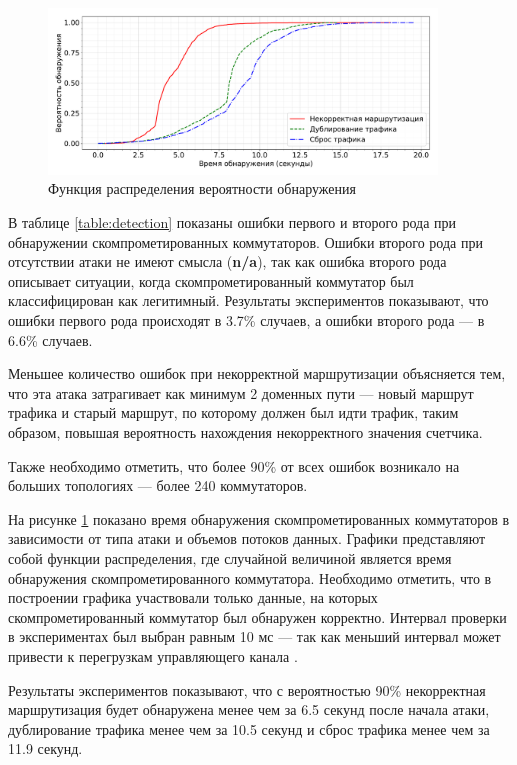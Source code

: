 \documentclass[../thesis.tex]{subfiles}
\begin{document}
\begin{figure}
\centering
\includegraphics[width=0.92\textwidth]{figures/experiments/detection.pdf}
\caption{Функция распределения вероятности обнаружения} \label{fig:detection_cdf}
\end{figure}

В таблице \ref{table:detection} показаны ошибки первого и второго рода при обнаружении скомпрометированных коммутаторов.
Ошибки второго рода при отсутствии атаки не имеют смысла (\textbf{n/a}), так как ошибка второго рода описывает ситуации, когда скомпрометированный коммутатор был классифицирован как легитимный.
Результаты экспериментов показывают, что ошибки первого рода происходят в 3.7\% случаев, а ошибки второго рода --- в 6.6\% случаев.

Меньшее количество ошибок при некорректной маршрутизации объясняется тем, что эта атака затрагивает как минимум 2 доменных пути --- новый маршрут трафика и старый маршрут, по которому должен был идти трафик, таким образом, повышая вероятность нахождения некорректного значения счетчика.

Также необходимо отметить, что более 90\% от всех ошибок возникало на больших топологиях --- более 240 коммутаторов.

На рисунке \ref{fig:detection_cdf} показано время обнаружения скомпрометированных коммутаторов в зависимости от типа атаки и объемов потоков данных.
Графики представляют собой функции распределения, где случайной величиной является время обнаружения скомпрометированного коммутатора.
Необходимо отметить, что в построении графика участвовали только данные, на которых скомпрометированный коммутатор был обнаружен корректно.
Интервал проверки в экспериментах был выбран равным 10 мс --- так как меньший интервал может привести к перегрузкам управляющего канала \cite{chowdhury2014payless}.

Результаты экспериментов показывают, что с вероятностью 90\% некорректная маршрутизация будет обнаружена менее чем за 6.5 секунд после начала атаки, дублирование трафика менее чем за 10.5 секунд и сброс трафика менее чем за 11.9 секунд.
\end{document}
